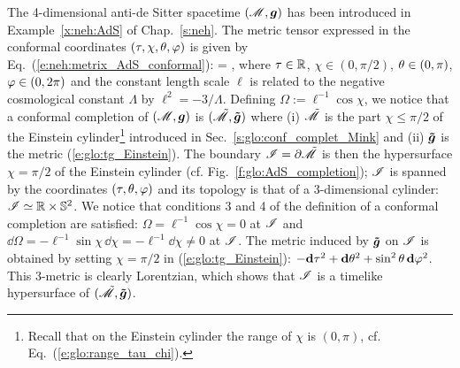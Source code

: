 \begin{example} \label{x:glo:AdS}
The 4-dimensional anti-de Sitter spacetime
$(\mathscr{M},\bm{g})$
has been introduced in Example~\ref{x:neh:AdS} of Chap.~\ref{s:neh}.
The metric tensor expressed in the conformal coordinates
$(\tau,\chi,\theta,\varphi)$ is given by Eq.~(\ref{e:neh:metrix_AdS_conformal}):
\be
     =   ,
\ee
where $\tau\in\mathbb{R}$, $\chi \in (0,\pi/2)$, $\theta\in(0,\pi)$, $\varphi\in(0,2\pi)$
and the constant length scale $\ell$ is related to the negative cosmological constant
$\Lambda$ by $\ell^2 = -3/\Lambda$.
Defining $\Omega := \ell^{-1}\cos\chi$, we notice that
a conformal completion of $(\mathscr{M},\bm{g})$ is $(\tilde{\mathscr{M}},\bm{\tilde{g}})$
where (i) $\tilde{\mathscr{M}}$ is the part $\chi \leq \pi/2$ of the Einstein cylinder\footnote{Recall that on the
Einstein cylinder the range of $\chi$ is $(0,\pi)$, cf. Eq.~(\ref{e:glo:range_tau_chi}).}
introduced in Sec.~\ref{s:glo:conf_complet_Mink}
and (ii)  $\bm{\tilde{g}}$ is the metric (\ref{e:glo:tg_Einstein}).
The boundary $\mathscr{I} = \partial\tilde{\mathscr{M}}$ is then the hypersurface $\chi=\pi/2$
of the Einstein cylinder (cf. Fig.~\ref{f:glo:AdS_completion});
$\mathscr{I}$ is spanned by the coordinates $(\tau,\theta,\varphi)$
and its topology is that of a 3-dimensional cylinder: $\mathscr{I} \simeq \mathbb{R}\times\mathbb{S}^2$.
We notice that conditions 3 and 4 of the definition of a conformal completion
are satisfied: $\Omega = \ell^{-1} \cos\chi = 0$ at $\mathscr{I}$ and
$\dd\Omega = - \ell^{-1} \sin\chi\, \dd\chi = -\ell^{-1} \dd\chi \not = 0 $
at $\mathscr{I}$.
The metric induced by $\bm{\tilde{g}}$ on $\mathscr{I}$ is obtained by
setting $\chi=\pi/2$ in (\ref{e:glo:tg_Einstein}):
$- \mathbf{d} \tau^2 + \mathbf{d}\theta^2 + \sin^2\theta \, \mathbf{d}\varphi^2$.
This 3-metric is clearly Lorentzian, which shows that $\mathscr{I}$ is a timelike
hypersurface of $(\tilde{\mathscr{M}},\bm{\tilde{g}})$.
\end{example}

